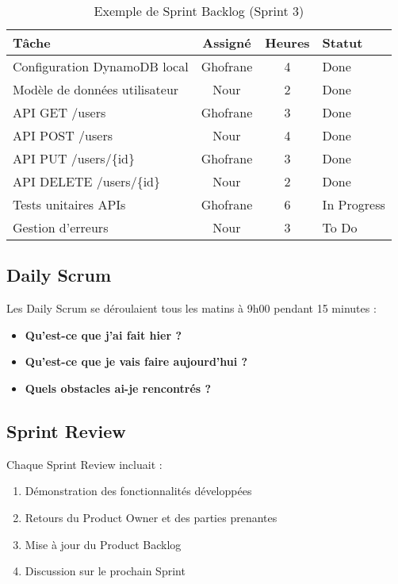 \begin{table}[H]
    \centering
    \begin{tabularx}{\textwidth}{|X|c|c|X|}
        \hline
        \textbf{Tâche} & \textbf{Assigné} & \textbf{Heures} & \textbf{Statut} \\
        \hline
        Configuration DynamoDB local & Ghofrane & 4 & Done \\
        \hline
        Modèle de données utilisateur & Nour & 2 & Done \\
        \hline
        API GET /users & Ghofrane & 3 & Done \\
        \hline
        API POST /users & Nour & 4 & Done \\
        \hline
        API PUT /users/\{id\} & Ghofrane & 3 & Done \\
        \hline
        API DELETE /users/\{id\} & Nour & 2 & Done \\
        \hline
        Tests unitaires APIs & Ghofrane & 6 & In Progress \\
        \hline
        Gestion d'erreurs & Nour & 3 & To Do \\
        \hline
    \end{tabularx}
    \caption{Exemple de Sprint Backlog (Sprint 3)}
    \label{tab:sprint3_backlog}
\end{table}

\subsection{Daily Scrum}

Les Daily Scrum se déroulaient tous les matins à 9h00 pendant 15 minutes :
\begin{itemize}
    \item \textbf{Qu'est-ce que j'ai fait hier ?}
    \item \textbf{Qu'est-ce que je vais faire aujourd'hui ?}
    \item \textbf{Quels obstacles ai-je rencontrés ?}
\end{itemize}

\subsection{Sprint Review}

Chaque Sprint Review incluait :
\begin{enumerate}
    \item Démonstration des fonctionnalités développées
    \item Retours du Product Owner et des parties prenantes
    \item Mise à jour du Product Backlog
    \item Discussion sur le prochain Sprint
\end{enumerate}

